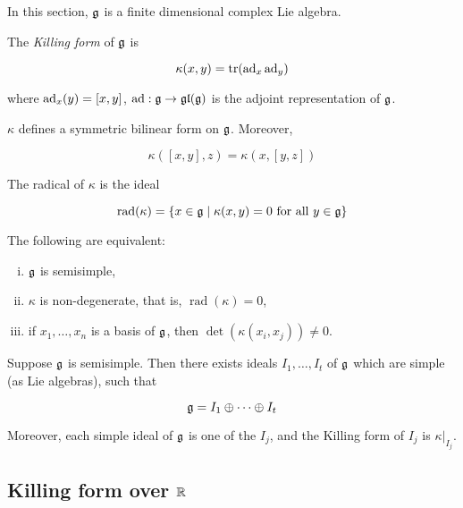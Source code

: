 \documentclass{article}
\DeclareMathOperator{\rad}{rad}
\begin{document}
In this section, \(\mathfrak{g}\) is a finite dimensional complex Lie algebra.

\begin{definition}
     The \emph{Killing form} of \(\mathfrak{g}\) is

    \[\kappa(x, y) = \tr(\operatorname{ad}_x \operatorname{ad}_y)\]

    where \(\operatorname{ad}_x(y) = [x, y]\), \(\operatorname{ad} : \mathfrak{g} \to \mathfrak{g}\mathfrak{l}(\mathfrak{g})\) is the adjoint representation of \(\mathfrak{g}\).
\end{definition}

\begin{lemma}
    \(\kappa\) defines a symmetric bilinear form on \(\mathfrak{g}\). Moreover,

    \[\kappa([x, y], z) = \kappa(x, [y, z])\]
\end{lemma}

\begin{definition}
    [radical] The radical of \(\kappa\) is the ideal

    \[\rad(\kappa) = \{x \in \mfg \mid \kappa(x, y) = 0 \text{ for all }y \in \mfg\}\]
\end{definition}

\begin{theorem}
    The following are equivalent:

    \begin{enumerate}[(i)]
        \item \(\mathfrak{g}\) is semisimple,
        \item \(\kappa\) is non-degenerate, that is, \(\rad(\kappa) = 0\),
        \item if \(x_1, \dots, x_n\) is a basis of \(\mathfrak{g}\), then \(\det(\kappa(x_i, x_j)) \ne 0\).
    \end{enumerate}
\end{theorem}

\begin{theorem}
    Suppose \(\mathfrak{g}\) is semisimple. Then there exists ideals \(I_1, \dots, I_t\) of \(\mathfrak{g}\) which are simple (as Lie algebras), such that

    \[\mathfrak{g} = I_1 \oplus \cdots \oplus I_t\]

    Moreover, each simple ideal of \(\mathfrak{g}\) is one of the \(I_j\), and the Killing form of \(I_j\) is \(\kappa\vert_{I_j}\).
\end{theorem}

\subsection{Killing form over \(\mathbb{R}\)}
\end{document}
